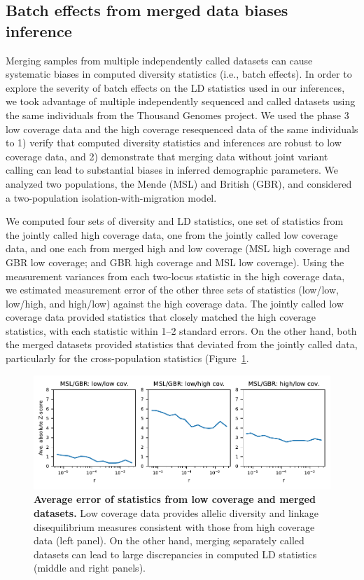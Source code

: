 \documentclass[]{article}
\begin{document}
\subsection{Batch effects from merged data biases inference}
\label{sec:merged-bias}

Merging samples from multiple independently called datasets can cause
systematic biases in computed diversity statistics (i.e., batch effects). In
order to explore the severity of batch effects on the LD statistics used in our
inferences, we took advantage of multiple independently sequenced and called
datasets using the same individuals from the Thousand Genomes project. We used
the phase 3 low coverage \citet{1000_Genomes_Project_Consortium2015-zq} data
and the high coverage resequenced data of the same individuals
\citep{Byrska-Bishop2021-jl} to 1) verify that computed diversity statistics
and inferences are robust to low coverage data, and 2) demonstrate that merging
data without joint variant calling can lead to substantial biases in inferred
demographic parameters. We analyzed two populations, the Mende (MSL) and
British (GBR), and considered a two-population isolation-with-migration model.

We computed four sets of diversity and LD statistics, one set of statistics
from the jointly called high coverage data, one from the jointly called low
coverage data, and one each from merged high and low coverage (MSL high
coverage and GBR low coverage; and GBR high coverage and MSL low coverage).
Using the measurement variances from each two-locus statistic in the high
coverage data, we estimated measurement error of the other three sets of
statistics (low/low, low/high, and high/low) against the high coverage data.
The jointly called low coverage data provided statistics that closely matched
the high coverage statistics, with each statistic within 1--2 standard errors.
On the other hand, both the merged datasets provided statistics that deviated
from the jointly called data, particularly for the cross-population statistics
(Figure~\ref{fig:supp-merged-data-SEs}.

\begin{figure}[ht!]
    \centering
    \includegraphics[width=5in]{figures/supp-SE-merged-data}
    \caption{
        \textbf{Average error of statistics from low coverage and merged
        datasets.} Low coverage data provides allelic diversity and linkage
        disequilibrium measures consistent with those from high coverage data
        (left panel). On the other hand, merging separately called datasets can
        lead to large discrepancies in computed LD statistics (middle and right
        panels).
    }
    \label{fig:supp-merged-data-SEs}
\end{figure}
\end{document}
